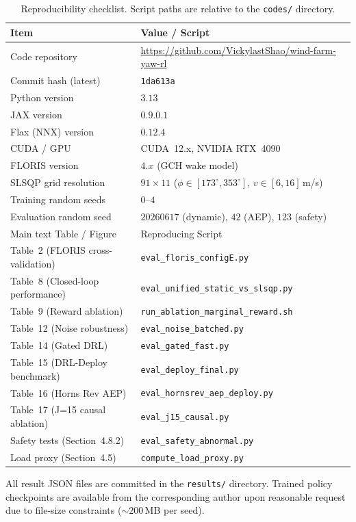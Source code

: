 \documentclass{article}
\begin{document}
\begin{table}[h]
\centering
\caption{Reproducibility checklist. Script paths are relative to the \texttt{codes/} directory.}
\label{tab:repro}
\small
\begin{tabular}{lp{6cm}}
\toprule
Item & Value / Script \\
\midrule
Code repository & \url{https://github.com/VickylastShao/wind-farm-yaw-rl} \\
Commit hash (latest) & \texttt{1da613a} \\
Python version & $3.13$ \\
JAX version & $0.9.0.1$ \\
Flax (NNX) version & $0.12.4$ \\
CUDA / GPU & CUDA~12.x, NVIDIA RTX~4090 \\
FLORIS version & $4.x$ (GCH wake model) \\
SLSQP grid resolution & $91{\times}11$ ($\phi{\in}[173^\circ,353^\circ]$, $v{\in}[6,16]$\,m/s) \\
Training random seeds & $0$--$4$ \\
Evaluation random seed & $20260617$ (dynamic), $42$ (AEP), $123$ (safety) \\
\midrule
Main text Table / Figure & Reproducing Script \\
\midrule
Table~2 (FLORIS cross-validation) & \texttt{eval\_floris\_configE.py} \\
Table~8 (Closed-loop performance) & \texttt{eval\_unified\_static\_vs\_slsqp.py} \\
Table~9 (Reward ablation) & \texttt{run\_ablation\_marginal\_reward.sh} \\
Table~12 (Noise robustness) & \texttt{eval\_noise\_batched.py} \\
Table~14 (Gated DRL) & \texttt{eval\_gated\_fast.py} \\
Table~15 (DRL-Deploy benchmark) & \texttt{eval\_deploy\_final.py} \\
Table~16 (Horns Rev AEP) & \texttt{eval\_hornsrev\_aep\_deploy.py} \\
Table~17 (J=15 causal ablation) & \texttt{eval\_j15\_causal.py} \\
Safety tests (Section~4.8.2) & \texttt{eval\_safety\_abnormal.py} \\
Load proxy (Section~4.5) & \texttt{compute\_load\_proxy.py} \\
\bottomrule
\end{tabular}
\end{table}

All result JSON files are committed in the \texttt{results/} directory. Trained policy checkpoints are available from the corresponding author upon reasonable request due to file-size constraints (${\sim}200$\,MB per seed).
\end{document}
